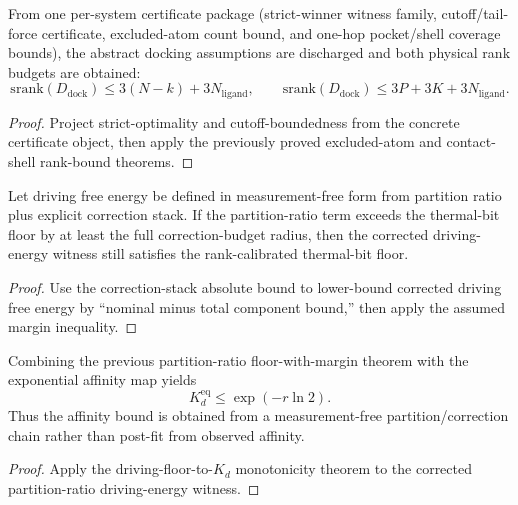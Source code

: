 \begin{theorem}\label{thm:md-concrete-physics-witness-discharge-bundle}
From one per-system certificate package (strict-winner witness family, cutoff/tail-force certificate, excluded-atom count bound, and one-hop pocket/shell coverage bounds), the abstract docking assumptions are discharged and both physical rank budgets are obtained:
\[
\mathrm{srank}(D_{\mathrm{dock}}) \le 3(N-k)+3N_{\mathrm{ligand}},\qquad
\mathrm{srank}(D_{\mathrm{dock}}) \le 3P+3K+3N_{\mathrm{ligand}}.
\]
\end{theorem}

\begin{proof}
Project strict-optimality and cutoff-boundedness from the concrete certificate object, then apply the previously proved excluded-atom and contact-shell rank-bound theorems.
\end{proof}

\begin{theorem}\label{thm:partition-ratio-driving-floor-with-correction-margin}
Let driving free energy be defined in measurement-free form from partition ratio plus explicit correction stack. If the partition-ratio term exceeds the thermal-bit floor by at least the full correction-budget radius, then the corrected driving-energy witness still satisfies the rank-calibrated thermal-bit floor.
\end{theorem}

\begin{proof}
Use the correction-stack absolute bound to lower-bound corrected driving free energy by ``nominal minus total component bound,'' then apply the assumed margin inequality.
\end{proof}

\begin{theorem}\label{thm:equilibrium-kd-bound-from-partition-ratio-correction-chain}
Combining the previous partition-ratio floor-with-margin theorem with the exponential affinity map yields
\[
K_d^{\mathrm{eq}} \le \exp(-r\ln 2).
\]
Thus the affinity bound is obtained from a measurement-free partition/correction chain rather than post-fit from observed affinity.
\end{theorem}

\begin{proof}
Apply the driving-floor-to-$K_d$ monotonicity theorem to the corrected partition-ratio driving-energy witness.
\end{proof}

